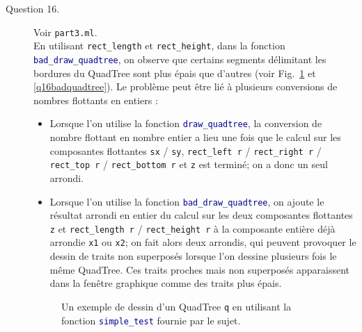 \documentclass[11pt]{scrartcl}
\newcommand{\funname}[1]{\texttt{\textcolor{darkblue}{#1}}}
\newcommand{\filename}[1]{\texttt{\textcolor{darkbrown}{#1}}}
\newcommand{\code}[1]{\texttt{#1}}
\begin{document}
\begin{description}
\item[Question 16.] Voir \filename{part3.ml}.\\
En utilisant \code{rect_length} et \code{rect_height}, dans la fonction \funname{bad_draw_quadtree}, on observe que certains segments délimitant les bordures du QuadTree sont plus épais que d'autres (voir Fig.~\ref{q16goodquadtree} et \ref{q16badquadtree}). Le problème peut être lié à plusieurs conversions de nombres flottants en entiers :
\begin{itemize}
	\item Lorsque l'on utilise la fonction \funname{draw_quadtree}, la conversion de nombre flottant en nombre entier a lieu une fois que le calcul sur les composantes flottantes \code{sx} / \code{sy}, \code{rect_left r} / \code{rect_right r} / \code{rect_top r} / \code{rect_bottom r} et \code{z} est terminé; on a donc un seul arrondi.
	\item Lorsque l'on utilise la fonction \funname{bad_draw_quadtree}, on ajoute le résultat arrondi en entier du calcul sur les deux composantes flottantes \code{z} et \code{rect_length r} / \code{rect_height r} à la composante entière déjà arrondie \code{x1} ou \code{x2}; on fait alors deux arrondis, qui peuvent provoquer le dessin de traits non superposés lorsque l'on dessine plusieurs fois le même QuadTree.
Ces traits proches mais non superposés apparaissent dans la fenêtre graphique comme des traits plus épais.
\end{itemize}

\begin{figure}[!h]
	\centering
	\caption{\label{q16goodquadtree} Un exemple de dessin d'un QuadTree \code{q} en utilisant la fonction \funname{simple_test} fournie par le sujet.}
\end{figure}


\end{description}
\end{document}
